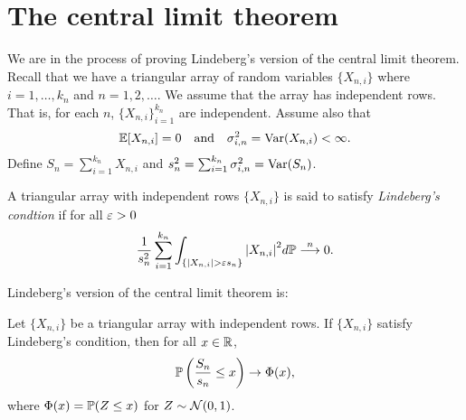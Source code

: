 \section{The central limit theorem}
We are in the process of proving Lindeberg's version of the central limit theorem. Recall that we have a triangular array of random variables $\{X_{n,i}\}$ where $i=1,\ldots, k_n$ and $n=1,2,\ldots$. We assume that the array has independent rows. That is, for each $n$, $\{X_{n,i}\}_{i=1}^{k_n}$ are independent. Assume also that 
\[{\mathbb{E}}[X_{n,i}]=0 ~~~\text{and}~~~\sigma_{i,n}^2 = \operatorname{Var}(X_{n,i})< \infty. \]
Define $S_n = \sum_{i=1}^{k_n}X_{n,i}$ and $s_n^2=\sum_{i=1}^{k_n} \sigma_{i,n}^2 = \operatorname{Var}(S_n)$. 
\begin{defn}
    A triangular array  with independent rows $\{X_{n,i}\}$ is said to satisfy \emph{Lindeberg's condtion} if for all $\varepsilon > 0$
    \[\frac{1}{s_n^2} \sum_{i=1}^{k_n} \int_{\{{\left\lvert X_{n,i}\right\rvert}>\varepsilon s_n\}}{\left\lvert X_{n,i}\right\rvert}^2d{\mathbb{P}} \stackrel{n}{\longrightarrow} 0. \]
\end{defn}
Lindeberg's version of the central limit theorem is:
\begin{thrm}[Lindeberg]
    Let $\{X_{n,i}\}$ be a triangular array with independent rows. If $\{X_{n,i}\}$ satisfy Lindeberg's condition, then for all $x \in {\mathbb R}$,
    \[{\mathbb{P}}\left(\frac{S_n}{s_n} \le x\right) \to \Phi(x),\]
    where $\Phi(x) = {\mathbb{P}}(Z \le x)$ for $Z \sim {{\mathcal{N}}}(0,1)$.
\end{thrm}
